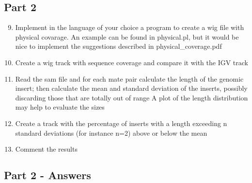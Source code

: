 \newpage
\subsection{Part 2}

\begin{enumerate}
\setcounter{enumi}{8}
  \item Implement in the language of your choice a program to create a wig
file with physical covarage.
An example can be found in physical.pl, but it would be nice to implement
the suggestions described in physical\_coverage.pdf
  \item Create a wig track with sequence coverage and compare it with the
IGV track
  \item Read the sam file and for each mate pair calculate the length of the
genomic insert; then calculate the mean and standard deviation of the inserts,
possibly discarding those that are totally out of range
A plot of the length distribution may help to evaluate the sizes
  \item Create a track with the percentage of inserts with a length exceeding
n standard deviations (for instance n=2) above or below the mean
  \item Comment the results
\end{enumerate}

\subsection{Part 2 - Answers}

